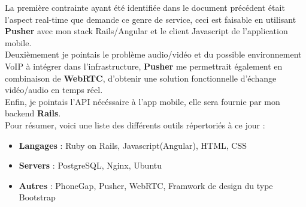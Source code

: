 \documentclass[a4paper,10pt,final,fleqn]{article}
\begin{document}
		La première contrainte ayant été identifiée dans le document précédent était l'aspect real-time que demande ce genre de service, ceci est faisable en utilisant \textbf{Pusher} avec mon stack Rails/Angular et le client Javascript de l'application mobile.\\

		Deuxièmement je pointais le problème audio/vidéo et du possible environnement VoIP à intégrer dans l'infrastructure, \textbf{Pusher} me permettrait également en combinaison de \textbf{WebRTC}, d'obtenir une solution fonctionnelle d'échange vidéo/audio en temps réel.\\

		Enfin, je pointais l'API nécéssaire à l'app mobile, elle sera fournie par mon backend \textbf{Rails}.\\

		Pour résumer, voici une liste des différents outils répertoriés à ce jour : \\
		
		\begin{itemize}
			\item \textbf{Langages} : Ruby on Rails, Javascript(Angular), HTML, CSS
			\item \textbf{Servers} : PostgreSQL, Nginx, Ubuntu
			\item \textbf{Autres} : PhoneGap, Pusher, WebRTC, Framwork de design du type Bootstrap\\
		\end{itemize}
\end{document}
